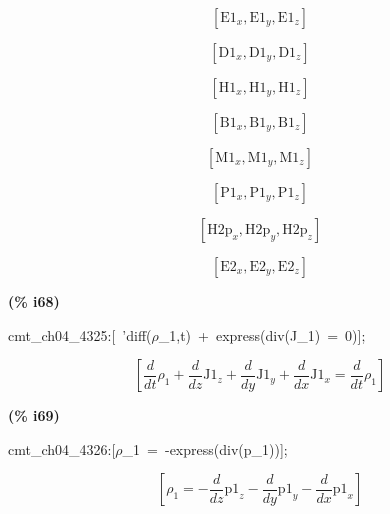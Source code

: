 \documentclass[fleqn]{article}
\begin{document}
\[\tag{\% o60} 
\left[ {{\ensuremath{\mathrm{E1}}}_x}\operatorname{,}{{\ensuremath{\mathrm{E1}}}_y}\operatorname{,}{{\ensuremath{\mathrm{E1}}}_z}\right] \mbox{}\]

\[\tag{\% o61} 
\left[ {{\ensuremath{\mathrm{D1}}}_x}\operatorname{,}{{\ensuremath{\mathrm{D1}}}_y}\operatorname{,}{{\ensuremath{\mathrm{D1}}}_z}\right] \mbox{}\]

\[\tag{\% o62} 
\left[ {{\ensuremath{\mathrm{H1}}}_x}\operatorname{,}{{\ensuremath{\mathrm{H1}}}_y}\operatorname{,}{{\ensuremath{\mathrm{H1}}}_z}\right] \mbox{}\]

\[\tag{\% o63} 
\left[ {{\ensuremath{\mathrm{B1}}}_x}\operatorname{,}{{\ensuremath{\mathrm{B1}}}_y}\operatorname{,}{{\ensuremath{\mathrm{B1}}}_z}\right] \mbox{}\]

\[\tag{\% o64} 
\left[ {{\ensuremath{\mathrm{M1}}}_x}\operatorname{,}{{\ensuremath{\mathrm{M1}}}_y}\operatorname{,}{{\ensuremath{\mathrm{M1}}}_z}\right] \mbox{}\]

\[\tag{\% o65} 
\left[ {{\ensuremath{\mathrm{P1}}}_x}\operatorname{,}{{\ensuremath{\mathrm{P1}}}_y}\operatorname{,}{{\ensuremath{\mathrm{P1}}}_z}\right] \mbox{}\]

\[\tag{\% o66} 
\left[ {{\ensuremath{\mathrm{H2p}}}_x}\operatorname{,}{{\ensuremath{\mathrm{H2p}}}_y}\operatorname{,}{{\ensuremath{\mathrm{H2p}}}_z}\right] \mbox{}\]

\[\tag{\% o67} 
\left[ {{\ensuremath{\mathrm{E2}}}_x}\operatorname{,}{{\ensuremath{\mathrm{E2}}}_y}\operatorname{,}{{\ensuremath{\mathrm{E2}}}_z}\right] \mbox{}
\]


\noindent
\begin{minipage}[t]{4.000000em}\color{red}\bfseries
(\% i68)	
\end{minipage}
\begin{minipage}[t]{\textwidth}\color{blue}
cmt\_ch04\_4325:[\ 'diff(\ensuremath{\rho}\_1,t)\ +\ express(div(J\_1)\ =\ 0)];
\end{minipage}
\[\displaystyle \tag{\% o68} 
\left[ \frac{d}{d t} {{\rho }_1}+\frac{d}{d z} {{\ensuremath{\mathrm{J1}}}_z}+\frac{d}{d y} {{\ensuremath{\mathrm{J1}}}_y}+\frac{d}{d x} {{\ensuremath{\mathrm{J1}}}_x}=\frac{d}{d t} {{\rho }_1}\right] \mbox{}
\]


\noindent
\begin{minipage}[t]{4.000000em}\color{red}\bfseries
(\% i69)	
\end{minipage}
\begin{minipage}[t]{\textwidth}\color{blue}
cmt\_ch04\_4326:[\ensuremath{\rho}\_1\ =\ -express(div(p\_1))];
\end{minipage}
\[\displaystyle \tag{\% o69} 
\left[ {{\rho }_1}=-\frac{d}{d z} {{\ensuremath{\mathrm{p1}}}_z}-\frac{d}{d y} {{\ensuremath{\mathrm{p1}}}_y}-\frac{d}{d x} {{\ensuremath{\mathrm{p1}}}_x}\right] \mbox{}
\]
\end{document}
